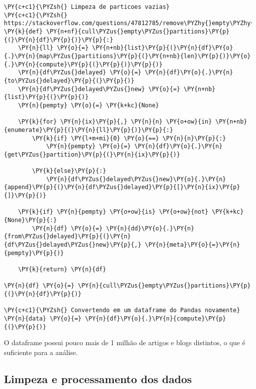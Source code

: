 \documentclass[a4paper,11pt,final]{article}
\begin{document}
\begin{Verbatim}[commandchars=\\\{\},frame=single,fontsize=\small, xleftmargin=0.5em]
\PY{c+c1}{\PYZsh{} Limpeza de particoes vazias}
\PY{c+c1}{\PYZsh{} https://stackoverflow.com/questions/47812785/remove\PYZhy{}empty\PYZhy{}partitions\PYZhy{}in\PYZhy{}dask}
\PY{k}{def} \PY{n+nf}{cull\PYZus{}empty\PYZus{}partitions}\PY{p}{(}\PY{n}{df}\PY{p}{)}\PY{p}{:}
    \PY{n}{ll} \PY{o}{=} \PY{n+nb}{list}\PY{p}{(}\PY{n}{df}\PY{o}{.}\PY{n}{map\PYZus{}partitions}\PY{p}{(}\PY{n+nb}{len}\PY{p}{)}\PY{o}{.}\PY{n}{compute}\PY{p}{(}\PY{p}{)}\PY{p}{)}
    \PY{n}{df\PYZus{}delayed} \PY{o}{=} \PY{n}{df}\PY{o}{.}\PY{n}{to\PYZus{}delayed}\PY{p}{(}\PY{p}{)}
    \PY{n}{df\PYZus{}delayed\PYZus{}new} \PY{o}{=} \PY{n+nb}{list}\PY{p}{(}\PY{p}{)}
    \PY{n}{pempty} \PY{o}{=} \PY{k+kc}{None}
    
    \PY{k}{for} \PY{n}{ix}\PY{p}{,} \PY{n}{n} \PY{o+ow}{in} \PY{n+nb}{enumerate}\PY{p}{(}\PY{n}{ll}\PY{p}{)}\PY{p}{:}
        \PY{k}{if} \PY{l+m+mi}{0} \PY{o}{==} \PY{n}{n}\PY{p}{:}
            \PY{n}{pempty} \PY{o}{=} \PY{n}{df}\PY{o}{.}\PY{n}{get\PYZus{}partition}\PY{p}{(}\PY{n}{ix}\PY{p}{)}
            
        \PY{k}{else}\PY{p}{:}
            \PY{n}{df\PYZus{}delayed\PYZus{}new}\PY{o}{.}\PY{n}{append}\PY{p}{(}\PY{n}{df\PYZus{}delayed}\PY{p}{[}\PY{n}{ix}\PY{p}{]}\PY{p}{)}
            
    \PY{k}{if} \PY{n}{pempty} \PY{o+ow}{is} \PY{o+ow}{not} \PY{k+kc}{None}\PY{p}{:}
        \PY{n}{df} \PY{o}{=} \PY{n}{dd}\PY{o}{.}\PY{n}{from\PYZus{}delayed}\PY{p}{(}\PY{n}{df\PYZus{}delayed\PYZus{}new}\PY{p}{,} \PY{n}{meta}\PY{o}{=}\PY{n}{pempty}\PY{p}{)}
        
    \PY{k}{return} \PY{n}{df}

\PY{n}{df} \PY{o}{=} \PY{n}{cull\PYZus{}empty\PYZus{}partitions}\PY{p}{(}\PY{n}{df}\PY{p}{)}

\PY{c+c1}{\PYZsh{} Convertendo em um dataframe do Pandas novamente}
\PY{n}{data} \PY{o}{=} \PY{n}{df}\PY{o}{.}\PY{n}{compute}\PY{p}{(}\PY{p}{)}
\end{Verbatim}


O dataframe possui pouco mais de 1 milhão de artigos e blogs distintos, o que é suficiente para a análise.

\subsection{Limpeza e processamento dos dados}
\end{document}

